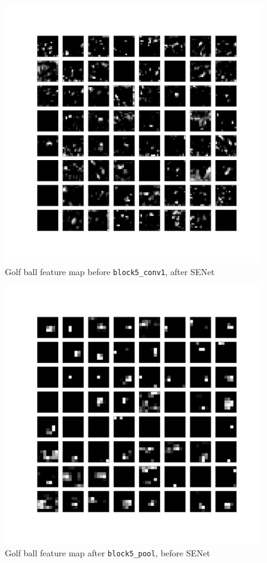 \documentclass{article}
\begin{document}
\begin{appendices}
\begin{figure}[H]
    \centering
    \includegraphics[width=6in]{csci-8110/hw-3/images/golf-post-SENet-block4_pool-2020-11-05 18_35_33.867099_output.png}
    \caption{Golf ball feature map before \lstinline{block5_conv1}, after SENet}
    \label{fig:golf_4_post}
\end{figure}
\begin{figure}[H]
    \centering
    \includegraphics[width=6in]{csci-8110/hw-3/images/golf-pre-SENet-block5_pool-2020-11-05 18_44_09.014537_output.png}
    \caption{Golf ball feature map after \lstinline{block5_pool}, before SENet}
    \label{fig:golf_5_pre}
\end{figure}


\end{appendices}
\end{document}
